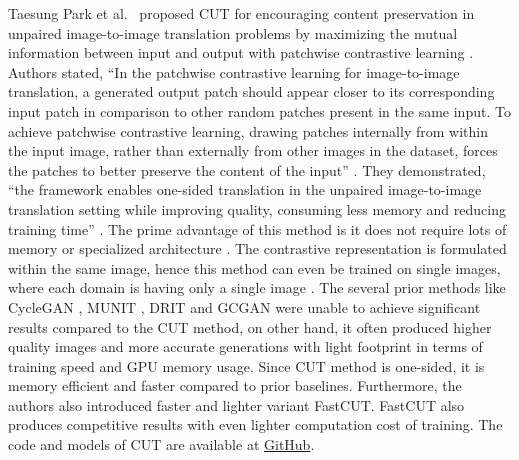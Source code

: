 Taesung Park et al.\ \cite{park2020contrastive} proposed \ac{CUT} for encouraging content preservation in unpaired image-to-image translation problems by maximizing the mutual information between input and output with patchwise contrastive learning \cite{oord2019representation}. Authors stated, ``In the patchwise contrastive learning for image-to-image translation, a generated output patch should appear closer to its corresponding input patch in comparison to other random patches present in the same input. To achieve patchwise contrastive learning, drawing patches internally from within the input image, rather than externally from other images in the dataset, forces the patches to better preserve the content of the input'' \cite{park2020contrastive}. They demonstrated, ``the framework enables one-sided translation in the unpaired image-to-image translation setting while improving quality, consuming less memory and reducing training time'' \cite{park2020contrastive}. The prime advantage of this method is it does not require lots of memory \cite{8578491} \cite{he2020momentum} or specialized architecture \cite{henaff2020dataefficient} \cite{bachman2019learning}. The contrastive representation is formulated within the same image, hence this method can even be trained on single images, where each domain is having only a single image \cite{park2020contrastive}. The several prior methods like \ac{CycleGAN} \cite{zhu2020unpaired}, \ac{MUNIT} \cite{liu2018unsupervised}, \ac{DRIT} \cite{lee2019drit} and \ac{GCGAN} \cite{fu2018geometryconsistent} were unable to achieve significant results compared to the \ac{CUT} method, on other hand, it often produced higher quality images and more accurate generations with light footprint in terms of training speed and GPU memory usage. Since \ac{CUT} method is one-sided, it is memory efficient and faster compared to prior baselines. Furthermore, the authors also introduced faster and lighter variant \ac{FastCUT}. \ac{FastCUT} also produces competitive results with even lighter computation cost of training. The code and models of \ac{CUT} are available at \href{https://github.com/taesungp/contrastive-unpaired-translation}{GitHub}.


